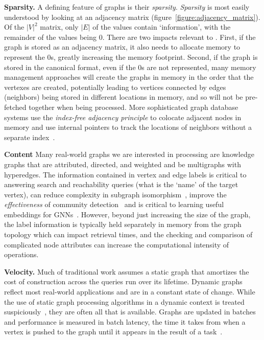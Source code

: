\textbf{Sparsity.}
A defining feature of graphs is their \textit{sparsity}.
\textit{Sparsity} is most easily understood by looking at an adjacency matrix (figure~\ref{figure:adjacency_matrix}).
Of the $|V|^{2}$ matrix, only $|E|$ of the values contain `information', with the remainder of the values being $0$.
There are two impacts relevant to \gai. 
First, if the graph is stored as an adjacency matrix, it also needs to allocate memory to represent the $0$s, greatly increasing the memory footprint. 
Second, if the graph is stored in the canonical format, even if the $0$s are not represented, many memory management approaches will create the graphs in memory in the order that the vertexes are created, potentially leading to vertices connected by edges (neighbors) being stored in different locations in memory, and so will not be pre-fetched together when being processed. 
More sophisticated graph database systems use the \textit{index-free adjacency principle} to colocate adjacent nodes in memory and use internal pointers to track the locations of neighbors without a separate index~\cite{Vukotic2015}.

\textbf{Content}
Many real-world graphs we are interested in processing are knowledge graphs that are attributed, directed, and weighted and be multigraphs with hyperedges. 
The information contained in vertex and edge labels is critical to answering search and reachability queries (what is the `name' of the target vertex), can reduce complexity in subgraph isomorphism~\cite{Mccreesh2018}, improve the \textit{effectiveness} of community detection~\cite{Zhang2020} and is critical to learning useful embeddings for GNNs~\cite{Hamilton2017}. 
However, beyond just increasing the size of the graph, the label information is typically held separately in memory from the graph topology which can impact retrieval times, and the checking and comparison of complicated node attributes can increase the computational intensity of operations. 

\textbf{Velocity.}
Much of traditional \gai work assumes a static graph that amortizes the cost of construction across the queries run over its lifetime.
Dynamic graphs reflect most real-world applications and are in a constant state of change. 
While the use of static graph processing algorithms in a dynamic context is treated suspiciously~\cite{Basak2020}, they are often all that is available.
Graphs are updated in batches and performance is measured in batch latency, the time it takes from when a vertex is pushed to the graph until it appears in the result of a \gai task~\cite{Zhang2012}.


